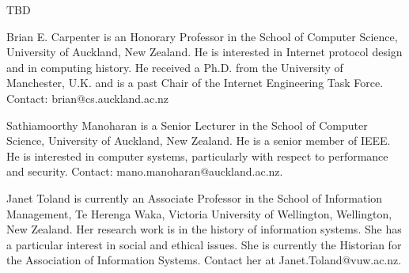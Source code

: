\documentclass{IEEEcsmag}
\begin{document}
TBD




\begin{IEEEbiography}{Brian E. Carpenter} is an Honorary Professor in the School of Computer Science, University of Auckland, New Zealand. He is interested in Internet protocol design and in computing history. He received a Ph.D. from the University of Manchester, U.K. and is a past Chair of the Internet Engineering Task Force. Contact: brian@cs.auckland.ac.nz\vspace*{8pt}
\end{IEEEbiography}

\begin{IEEEbiography}{Sathiamoorthy Manoharan} is a Senior Lecturer in the School of Computer Science, University of Auckland, New Zealand.
He is a senior member of IEEE. He is interested in computer systems, particularly with respect to performance and security. Contact: mano.manoharan@auckland.ac.nz.\vspace*{8pt}
\end{IEEEbiography}

\begin{IEEEbiography}{Janet Toland} is currently an Associate Professor in the
School of Information Management, Te Herenga Waka, Victoria
University of Wellington, Wellington, New Zealand. Her
research work is in the history of information systems. She
has a particular interest in social and ethical issues. She is
currently the Historian for the Association of Information
Systems. Contact her at Janet.Toland@vuw.ac.nz.\vspace*{8pt}
\end{IEEEbiography}
\end{document}
